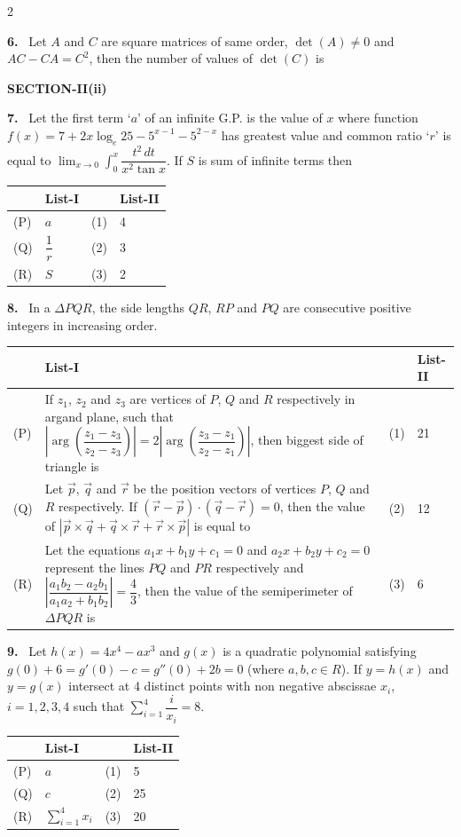 \documentclass[10pt]{extarticle}
\newcommand{\sect}[1]{\par\smallskip\noindent\textbf{#1}\par}
\newcommand{\qn}[1]{\par\smallskip\noindent\textbf{#1.}~}
\begin{document}
\begin{multicols}{2}
\qn{6} Let $A$ and $C$ are square matrices of same order, $\det(A)\ne0$ and $AC-CA=C^2$, then the number of values of $\det(C)$ is

\sect{SECTION-II(ii)}
\qn{7} Let the first term `$a$' of an infinite G.P. is the value of $x$ where function $f(x)=7+2x\log_e25-5^{x-1}-5^{2-x}$ has greatest value and common ratio `$r$' is equal to $\displaystyle\lim_{x\to0}\int_0^x\dfrac{t^2\,dt}{x^2\tan x}$. If $S$ is sum of infinite terms then
\begin{center}\footnotesize
\begin{tabular}{|p{0.6cm}|p{1.2cm}|p{0.6cm}|p{1.0cm}|}
\hline
 & \centering List-I & & \centering List-II\tabularnewline
\hline
(P) & $a$ & (1) & 4\\
(Q) & $\dfrac1r$ & (2) & 3\\
(R) & $S$ & (3) & 2\\
\hline
\end{tabular}
\end{center}

\qn{8} In a $\Delta PQR$, the side lengths $QR$, $RP$ and $PQ$ are consecutive positive integers in increasing order.
\begin{center}\footnotesize
\begin{tabular}{|p{0.6cm}|p{5.3cm}|p{0.6cm}|p{1.0cm}|}
\hline
 & \centering List-I & & \centering List-II\tabularnewline
\hline
(P) & If $z_1$, $z_2$ and $z_3$ are vertices of $P$, $Q$ and $R$ respectively in argand plane, such that $\left|\arg\left(\dfrac{z_1-z_3}{z_2-z_3}\right)\right|=2\left|\arg\left(\dfrac{z_3-z_1}{z_2-z_1}\right)\right|$, then biggest side of triangle is & (1) & 21\\
\hline
(Q) & Let $\vec p$, $\vec q$ and $\vec r$ be the position vectors of vertices $P$, $Q$ and $R$ respectively. If $(\vec r-\vec p)\cdot(\vec q-\vec r)=0$, then the value of $|\vec p\times\vec q+\vec q\times\vec r+\vec r\times\vec p|$ is equal to & (2) & 12\\
\hline
(R) & Let the equations $a_1x+b_1y+c_1=0$ and $a_2x+b_2y+c_2=0$ represent the lines $PQ$ and $PR$ respectively and $\left|\dfrac{a_1b_2-a_2b_1}{a_1a_2+b_1b_2}\right|=\dfrac43$, then the value of the semiperimeter of $\Delta PQR$ is & (3) & 6\\
\hline
\end{tabular}
\end{center}

\qn{9} Let $h(x)=4x^4-ax^3$ and $g(x)$ is a quadratic polynomial satisfying $g(0)+6=g'(0)-c=g''(0)+2b=0$ (where $a,b,c\in R$). If $y=h(x)$ and $y=g(x)$ intersect at 4 distinct points with non negative abscissae $x_i$, $i=1,2,3,4$ such that $\displaystyle\sum_{i=1}^4\dfrac i{x_i}=8$.
\begin{center}\footnotesize
\begin{tabular}{|p{0.6cm}|p{1.6cm}|p{0.6cm}|p{1.0cm}|}
\hline
 & \centering List-I & & \centering List-II\tabularnewline
\hline
(P) & $a$ & (1) & 5\\
(Q) & $c$ & (2) & 25\\
(R) & $\displaystyle\sum_{i=1}^4x_i$ & (3) & 20\\
\hline
\end{tabular}
\end{center}


\end{multicols}
\end{document}
